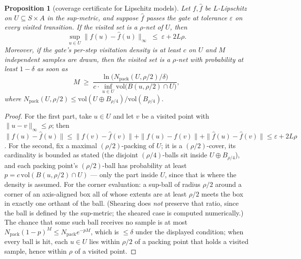 \documentclass[11pt]{article}
\newtheorem{proposition}{Proposition}
\theoremstyle{definition}
\theoremstyle{remark}
\begin{document}
\begin{proposition}[coverage certificate for Lipschitz models]
\label{prop:coverage}
Let $f, \hat f$ be $L$-Lipschitz on $U \subseteq S \times A$ in the sup-metric, and suppose $\hat f$ passes the gate at tolerance $\varepsilon$ on every visited transition. If the visited set is a $\rho$-net of $U$, then
\[
  \sup_{u \in U} \|f(u) - \hat f(u)\|_\infty \;\leq\; \varepsilon + 2L\rho .
\]
Moreover, if the gate's per-step visitation density is at least $c$ on $U$ and $M$ independent samples are drawn, then the visited set is a $\rho$-net with probability at least $1-\delta$ as soon as
\[
  M \;\geq\; \frac{\ln\!\big(N_{\mathrm{pack}}(U, \rho/2)/\delta\big)}{c \cdot \inf_{u \in U}\mathrm{vol}\big(B(u,\rho/2) \cap U\big)},
\]
where $N_{\mathrm{pack}}(U,\rho/2) \leq \mathrm{vol}(U \oplus B_{\rho/4})/\mathrm{vol}(B_{\rho/4})$.
\end{proposition}

\begin{proof}
For the first part, take $u \in U$ and let $v$ be a visited point with $\|u - v\|_\infty \leq \rho$; then $\|f(u) - \hat f(u)\| \leq \|f(v) - \hat f(v)\| + \|f(u)-f(v)\| + \|\hat f(u) - \hat f(v)\| \leq \varepsilon + 2L\rho$. For the second, fix a maximal $(\rho/2)$-packing of $U$; it is a $(\rho/2)$-cover, its cardinality is bounded as stated (the disjoint $(\rho/4)$-balls sit inside $U \oplus B_{\rho/4}$), and each packing point's $(\rho/2)$-ball has probability at least $p = c\,\mathrm{vol}(B(u,\rho/2) \cap U)$ --- only the part inside $U$, since that is where the density is assumed. For the corner evaluation: a sup-ball of radius $\rho/2$ around a corner of an axis-aligned box all of whose extents are at least $\rho/2$ meets the box in exactly one orthant of the ball. (Shearing does \emph{not} preserve that ratio, since the ball is defined by the sup-metric; the sheared case is computed numerically.) The chance that some such ball receives no sample is at most $N_{\mathrm{pack}} (1-p)^M \leq N_{\mathrm{pack}} e^{-pM}$, which is $\leq \delta$ under the displayed condition; when every ball is hit, each $u \in U$ lies within $\rho/2$ of a packing point that holds a visited sample, hence within $\rho$ of a visited point.
\end{proof}
\end{document}
